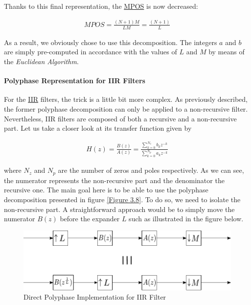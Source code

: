 Thanks to this final representation, the \hyperlink{MPOS}{MPOS} is now decreased:

\begin{align}
	MPOS =  \frac{(N+1)M}{LM} = \frac{(N+1)}{L}\label{eqn:final_poly}
\end{align}

As a result, we obviously chose to use this decomposition. The integers $a$ and $b$ are simply pre-computed in accordance with the values of $L$ and $M$ by means of the \textit{Euclidean Algorithm}.


\paragraph{Polyphase Representation for IIR Filters}

\justify

For the \hyperlink{IIR}{IIR} filters, the trick is a little bit more complex. As previously described, the former polyphase decomposition can only be applied to a non-recursive filter. Nevertheless, IIR filters are composed of both a recursive and a non-recursive part. Let us take a closer look at its transfer function given by 

\begin{align}
	H(z) = \frac{B(z)}{A(z)} =  \frac{\sum\limits_{k=0}^{N_z} b_kz^{-k} }{\sum\limits_{k=0}^{N_p} a_kz^{-k}}
	\label{eqn:3.14}
\end{align}

where $N_z$ and $N_p$ are the number of zeros and poles respectively. As we can see, the numerator represents the non-recursive part and the denominator the recursive one. The main goal here is to be able to use the polyphase decomposition presented in figure \ref{Figure 3.8}. To do so, we need to isolate the non-recursive part. A straightforward approach would be to simply move the numerator $B(z)$ before the expander $L$ such as illustrated in the figure below.

\begin{figure}[ht!]
	\centering
	\includegraphics[scale=0.8]{iir_direct_poly.pdf}
	\caption{Direct Polyphase Implementation for IIR Filter}
	\label{Figure 3.9}
\end{figure}

